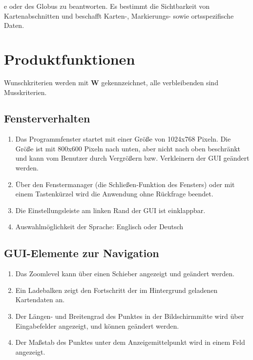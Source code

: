 \documentclass[10pt]{scrreprt}
\newcommand{\sfbf}[1]{\textbf{\sffamily #1}}
\newcommand{\W}{\sfbf{W}}
\newcommand{\ziel}[1]{{\fontsize{9.5}{11}\textsf{/#1/}}}
\newcommand{\ziellabel}{Z}
\newcommand{\muss}{\renewcommand{\labelenumi}{\textbf{\ziel{\ziellabel\numprint{\theenumi}0}}}}
\begin{document}
e oder des Globus zu beantworten. Es bestimmt die Sichtbarkeit von Kartenabschnitten und beschafft Karten-, Markierungs- sowie ortsspezifische Daten.


\chapter{Produktfunktionen}

\muss
\renewcommand{\ziellabel}{F}

Wunschkriterien werden mit {\W } gekennzeichnet, alle verbleibenden sind Musskriterien.

\section{Fensterverhalten}
\begin{enumerate}[leftmargin=2.2cm]
\item Das Programmfenster startet mit einer Größe von 1024x768 Pixeln. Die Größe ist mit 800x600 Pixeln nach unten, aber nicht nach oben beschränkt und kann vom Benutzer durch Vergrößern bzw. Verkleinern der GUI geändert werden.
\item Über den Fenstermanager (die Schließen-Funktion des Fensters) oder mit einem Tastenkürzel wird die Anwendung ohne Rückfrage beendet.
\item Die Einstellungsleiste am linken Rand der GUI ist einklappbar.
\item Auswahlmöglichkeit der Sprache: Englisch oder Deutsch
\end{enumerate}

\section{GUI-Elemente zur Navigation}
\begin{enumerate}[leftmargin=2.2cm,resume]
\item Das Zoomlevel kann über einen Schieber angezeigt und geändert werden.
\item Ein Ladebalken zeigt den Fortschritt der im Hintergrund geladenen Kartendaten an.
\item Der Längen- und Breitengrad des Punktes in der Bildschirmmitte wird über Eingabefelder angezeigt, und können geändert werden.
\item Der Maßstab des Punktes unter dem Anzeigemittelpunkt wird in einem Feld angezeigt.
\end{enumerate}
\end{document}
